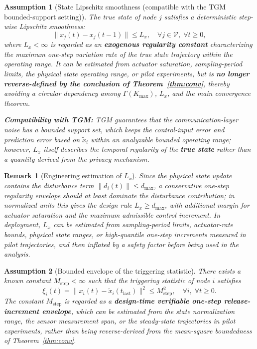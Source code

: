 \documentclass[10pt]{article}
\newtheorem{assumption}{Assumption}[section]
\newtheorem{remark}{Remark}[section]
\newcommand{\TGM}{TGM}
\newcommand{\dmax}{d_{\max}}
\newcommand{\Mstep}{M_{\text{step}}}
\begin{document}
\begin{assumption}[State Lipschitz smoothness (compatible with the \TGM{} bounded-support setting)]\label{ass:lipschitz}
  The true state of node $j$ satisfies a deterministic step-wise Lipschitz smoothness:
  \[
    \|x_j(t)-x_j(t-1)\| \leq L_x,\quad \forall j\in\mathcal{V},\;\forall t\geq0,
  \]
  where $L_x<\infty$ is regarded as an \textbf{exogenous regularity constant} characterizing the maximum one-step variation rate of the true state trajectory within the operating range. It can be estimated from actuator saturation, sampling-period limits, the physical state operating range, or pilot experiments, but is \textbf{no longer reverse-defined by the conclusion of Theorem~\ref{thm:conv}}, thereby avoiding a circular dependency among $\Gamma(K_{\max})$, $L_x$, and the main convergence theorem.

  \textbf{Compatibility with \TGM{}:} \TGM{} guarantees that the communication-layer noise has a bounded support set, which keeps the control-input error and prediction error based on $\tilde{x}_i$ within an analyzable bounded operating range; however, $L_x$ itself describes the temporal regularity of the \textbf{true state} rather than a quantity derived from the privacy mechanism.
\end{assumption}

\begin{remark}[Engineering estimation of $L_x$]
  Since the physical state update contains the disturbance term $\|d_i(t)\|\leq\dmax$, a conservative one-step regularity envelope should at least dominate the disturbance contribution; in normalized units this gives the design rule $L_x\geq\dmax$, with additional margin for actuator saturation and the maximum admissible control increment. In deployment, $L_x$ can be estimated from sampling-period limits, actuator-rate bounds, physical state ranges, or high-quantile one-step increments measured in pilot trajectories, and then inflated by a safety factor before being used in the analysis.
\end{remark}

\begin{assumption}[Bounded envelope of the triggering statistic]\label{ass:xi}
  There exists a known constant $\Mstep<\infty$ such that the triggering statistic of node $i$ satisfies
  \[
    \xi_i(t)=\|x_i(t)-\tilde{x}_i(t_{\mathrm{last}})\|^2 \leq \Mstep^2,\quad \forall i,\;\forall t\geq0.
  \]
  The constant $\Mstep$ is regarded as a \textbf{design-time verifiable one-step release-increment envelope}, which can be estimated from the state normalization range, the sensor measurement span, or the steady-state trajectories in pilot experiments, rather than being reverse-derived from the mean-square boundedness of Theorem~\ref{thm:conv}.
\end{assumption}
\end{document}
